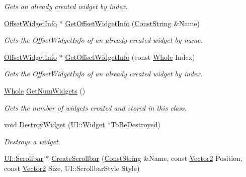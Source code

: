 \begin{DoxyCompactItemize}
\begin{DoxyCompactList}\small\item\em Gets an already created widget by index. \item\end{DoxyCompactList}\item 
\hyperlink{structphys_1_1UI_1_1ResizingInfo}{OffsetWidgetInfo} $\ast$ \hyperlink{classphys_1_1UI_1_1Window_a77a2091e41766344253cac55af650f54}{GetOffsetWidgetInfo} (\hyperlink{namespacephys_a5ce5049f8b4bf88d6413c47b504ebb31}{ConstString} \&Name)
\begin{DoxyCompactList}\small\item\em Gets the OffsetWidgetInfo of an already created widget by name. \item\end{DoxyCompactList}\item 
\hyperlink{structphys_1_1UI_1_1ResizingInfo}{OffsetWidgetInfo} $\ast$ \hyperlink{classphys_1_1UI_1_1Window_a7c87561dd83402f852c98c18fce675eb}{GetOffsetWidgetInfo} (const \hyperlink{namespacephys_a460f6bc24c8dd347b05e0366ae34f34a}{Whole} Index)
\begin{DoxyCompactList}\small\item\em Gets the OffsetWidgetInfo of an already created widget by index. \item\end{DoxyCompactList}\item 
\hyperlink{namespacephys_a460f6bc24c8dd347b05e0366ae34f34a}{Whole} \hyperlink{classphys_1_1UI_1_1Window_a062270984d25dca44f0bc4d65ef324a0}{GetNumWidgets} ()
\begin{DoxyCompactList}\small\item\em Gets the number of widgets created and stored in this class. \item\end{DoxyCompactList}\item 
void \hyperlink{classphys_1_1UI_1_1Window_ab4bda54a82b64aec2cf4e03201a40772}{DestroyWidget} (\hyperlink{classphys_1_1UI_1_1Widget}{UI::Widget} $\ast$ToBeDestroyed)
\begin{DoxyCompactList}\small\item\em Destroys a widget. \item\end{DoxyCompactList}\item 
\hyperlink{classphys_1_1UI_1_1Scrollbar}{UI::Scrollbar} $\ast$ \hyperlink{classphys_1_1UI_1_1Window_aaa780401181e4ed69409b8f8a6396872}{CreateScrollbar} (\hyperlink{namespacephys_a5ce5049f8b4bf88d6413c47b504ebb31}{ConstString} \&Name, const \hyperlink{classphys_1_1Vector2}{Vector2} Position, const \hyperlink{classphys_1_1Vector2}{Vector2} Size, UI::ScrollbarStyle Style)

\end{DoxyCompactItemize}
